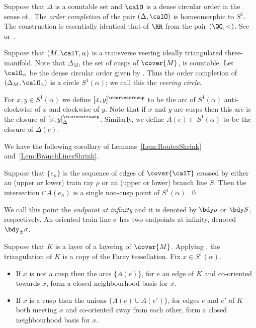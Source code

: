 \documentclass[12pt]{amsart}
\newcommand{\acw}{\rcurvearrowup}
\begin{document}
Suppose that $\Delta$ is a countable set and $\calO$ is a dense circular order in the sense of .  The \emph{order completion} of the pair $(\Delta, \calO)$ is homeomorphic to $S^1$.  The construction is essentially identical that of $\RR$ from the pair $(\QQ, <)$.  See~\cite[Proposition 2.1.7]{Thurston98} or~\cite[Theorem~2.47]{Calegari07}.  

\begin{definition}
\label{Def:VeeringCircle}
Suppose that $(M, \calT, \alpha)$ is a transverse veering ideally triangulated three-manifold.  Note that $\Delta_M$, the set of cusps of $\cover{M}$, is countable.  Let $\calO_\alpha$ be the dense circular order given by .  Thus the order completion of $(\Delta_M, \calO_\alpha)$ is a circle $S^1(\alpha)$; we call this the \emph{veering circle}.  
\end{definition}

For $x, y \in S^1(\alpha)$ we define $[x, y]^\acw$ to be the arc of $S^1(\alpha)$ anti-clockwise of $x$ and clockwise of $y$.  Note that if $x$ and $y$ are cusps then this arc is the closure of $[x, y]_\Delta^\acw$.  Similarly, we define $A(e) \subset S^1(\alpha)$ to be the closure of $\Delta(e)$.  

We have the following corollary of Lemmas~\ref{Lem:RoutesShrink} and~\ref{Lem:BranchLinesShrink}.

\begin{corollary}
\label{Cor:Irrational}
Suppose that $\{e_n\}$ is the sequence of edges of $\cover{\calT}$ crossed by either an (upper or lower) train ray $\rho$ or an (upper or lower) branch line $S$.  Then the intersection $\cap A(e_n)$ is a single non-cusp point of $S^1(\alpha)$. \qed
\end{corollary}

We call this point the \emph{endpoint at infinity} and it is denoted by $\bdy \rho$ or $\bdy S$, respectively.  
An oriented train line $\sigma$ has two endpoints at infinity, denoted $\bdy_\pm \sigma$.

\begin{remark}
\label{Rem:NeighbourhoodBasis}
Suppose that $K$ is a layer of a layering of $\cover{M}$.  Applying , the triangulation of $K$ is a copy of the Farey tessellation.  Fix $x \in S^1(\alpha)$.  
\begin{itemize}
\item
If $x$ is not a cusp then the arcs $\{ A(e) \}$, for $e$ an edge of $K$ and co-oriented towards $x$, form a closed neighbourhood basis for $x$.  
\item
If $x$ is a cusp then the unions $\{ A(e) \cup A(e') \}$, for edges $e$ and $e'$ of $K$ both meeting $x$ and co-oriented away from each other, form a closed neighbourhood basis for $x$. \qedhere
\end{itemize}
\end{remark}
\end{document}

